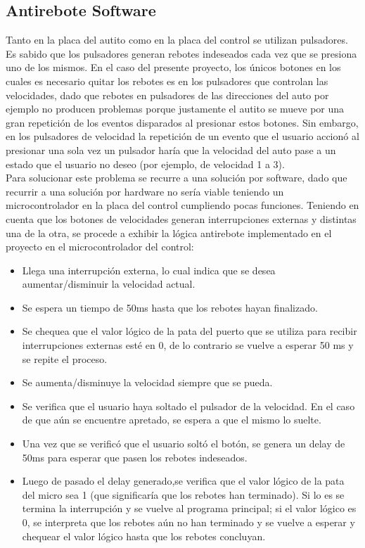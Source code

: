 \documentclass[a4paper,10pt]{article}
\begin{document}
		\subsection{Antirebote Software}
			Tanto en la placa del autito como en la placa del control se utilizan pulsadores. Es sabido que los pulsadores generan rebotes indeseados cada 
			vez que se presiona uno de los mismos. En el caso del presente proyecto, los únicos botones en los cuales es necesario quitar los rebotes es en 
			los pulsadores que controlan las velocidades, dado que rebotes en pulsadores de las direcciones del auto por ejemplo no producen problemas porque 
			justamente el autito 	se mueve por una gran repetición de los eventos disparados al presionar estos botones. Sin embargo, en los pulsadores de 
			velocidad la repetición de un evento que el usuario accionó al presionar una sola vez un pulsador haría que la velocidad del auto pase a un estado 
			que el usuario no deseo (por ejemplo, de velocidad 1 a 3).  \\
			\indent Para solucionar este problema se recurre a una solución por software, dado que recurrir a una solución por hardware no sería viable teniendo 
			un microcontrolador en la placa del control cumpliendo pocas funciones. Teniendo en cuenta que los botones de velocidades generan interrupciones 
			externas y distintas una de la otra, se procede a exhibir la lógica antirebote implementado en el proyecto en el microcontrolador del
			control:
			
			\begin{itemize}
				\item Llega una interrupción externa, lo cual indica que se desea aumentar/disminuir la velocidad actual.   		\item Se espera un tiempo de 50ms hasta que los rebotes hayan finalizado.
				\item Se chequea que el valor lógico de la pata del puerto que se utiliza para recibir interrupciones externas esté en 0, de lo contrario se vuelve a esperar 50 ms y se repite el proceso.
				\item Se aumenta/disminuye la velocidad siempre que se pueda.
				\item Se verifica que el usuario haya soltado el pulsador de la velocidad. En el caso de que aún se encuentre apretado, se espera a que el mismo lo 
				suelte.
				\item Una vez que se verificó que el usuario soltó el botón, se genera un delay de 50ms para esperar que pasen los rebotes indeseados.
				\item Luego de pasado el delay generado,se verifica que el valor lógico de la pata del micro sea 1 (que significaría que los rebotes han terminado). Si lo es se termina la interrupción y se vuelve al programa principal; si el valor lógico es 0, se interpreta que los rebotes aún no han terminado y se vuelve a esperar y chequear el valor lógico hasta que los rebotes concluyan. 
			\end{itemize}     
			
\end{document}
